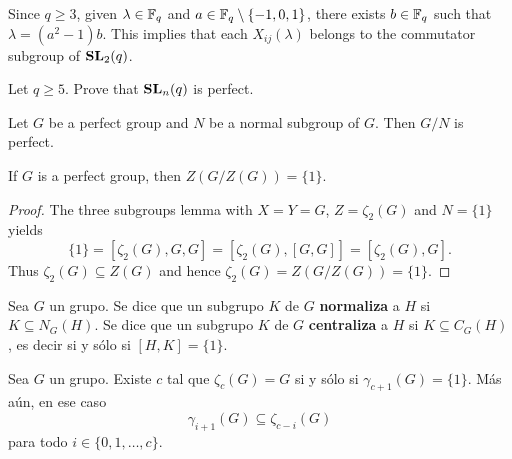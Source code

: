 Since $q\geq 3$, given $\lambda\in\mathbb{F}_q$ and $a\in\mathbb{F}_q\setminus\{-1,0,1\}$, there exists
$b\in\mathbb{F}_q$ such that $\lambda=(a^2-1)b$. This implies that each $X_{ij}(\lambda)$ belongs to the
commutator subgroup of $\mathbf{SL}_2(q)$. 


\begin{exercise}
Let $q\geq5$. 
Prove that $\mathbf{SL}_n(q)$ is perfect.  	
\end{exercise}


\begin{exercise}
Let $G$ be a perfect group and $N$ be a normal subgroup of $G$. Then $G/N$ is perfect.  	
\end{exercise}

\begin{theorem}[Gr\"un]
	\label{theorem:Grun}
	If $G$ is a perfect group, then $Z(G/Z(G))=\{1\}$. 
\end{theorem}

\begin{proof}
	The three subgroups lemma with $X=Y=G$, $Z=\zeta_2(G)$ and $N=\{1\}$ yields  
	\[
	\{1\}=[\zeta_2(G),G,G]=[\zeta_2(G),[G,G]]=[\zeta_2(G),G].
	\]
	Thus 	
	$\zeta_2(G)\subseteq Z(G)$ and hence 
	$\zeta_2(G)=Z(G/Z(G))=\{1\}$. 
\end{proof}

    Sea $G$ un grupo. Se dice que un subgrupo $K$ de $G$ \textbf{normaliza} a
	$H$ si $K\subseteq N_G(H)$.
	Se dice que un subgrupo $K$ de $G$ \textbf{centraliza} a
	$H$ si $K\subseteq C_G(H)$, es decir si y sólo si $[H,K]=\{1\}$.

\begin{lemma}
	\label{lemma:gamma_zeta}
	Sea $G$ un grupo. Existe $c$ tal que $\zeta_c(G)=G$ si y sólo si 
	$\gamma_{c+1}(G)=\{1\}$. Más aún, en ese caso 
	\[
	\gamma_{i+1}(G)\subseteq\zeta_{c-i}(G)
	\]
	para todo $i\in\{0,1,\dots,c\}$. 
\end{lemma}

